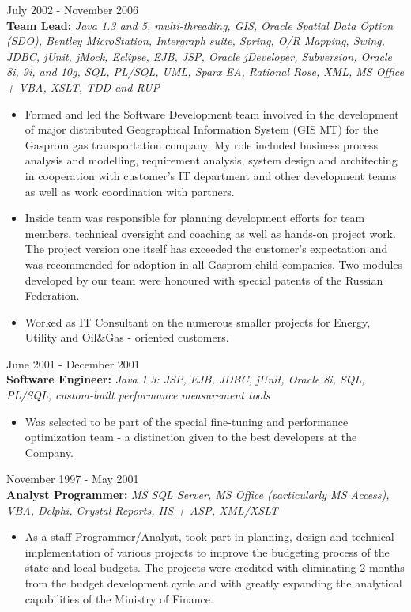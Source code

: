 \documentclass{res}
\begin{document}
\begin{resume}
 \hfill        July 2002 - November 2006\\
{\bf Team Lead:} {\em Java 1.3 and 5, multi-threading, GIS, Oracle Spatial Data Option (SDO), Bentley MicroStation, Intergraph suite, Spring, O/R Mapping, Swing, JDBC, jUnit, jMock, Eclipse, EJB, JSP, Oracle jDeveloper, Subversion, Oracle 8i, 9i, and 10g, SQL, PL/SQL, UML, Sparx EA, Rational Rose, XML, MS Office + VBA, XSLT, TDD and RUP}
\begin{itemize} \itemsep -2pt %
 \item Formed and led the Software Development team involved in the development of major distributed Geographical Information System (GIS MT) for the Gasprom gas transportation company. My role included business process analysis and modelling, requirement analysis, system design and architecting in cooperation with customer’s IT department and other development teams as well as work coordination with partners.
 \item Inside team was responsible for planning development efforts for team members, technical oversight and coaching as well as hands-on project work. The project version one itself has exceeded the customer’s expectation and was recommended for adoption in all Gasprom child companies. Two modules developed by our team were honoured with special patents of the Russian Federation.
 \item Worked as IT Consultant on the numerous smaller projects for Energy, Utility and Oil\&Gas - oriented customers.
\end{itemize}

 \hfill        June 2001 - December 2001\\
{\bf Software Engineer:} {\em Java 1.3: JSP, EJB, JDBC, jUnit, Oracle 8i, SQL, PL/SQL, custom-built performance measurement tools}
\begin{itemize} \itemsep -2pt %
 \item Was selected to be part of the special fine-tuning and performance optimization team - a distinction given to the best developers at the Company.
\end{itemize}

 \hfill        November 1997 - May 2001\\
{\bf Analyst Programmer:} {\em MS SQL Server, MS Office (particularly MS Access), VBA, Delphi, Crystal Reports, IIS + ASP, XML/XSLT}
\begin{itemize} \itemsep -2pt %
 \item As a staff Programmer/Analyst, took part in planning, design and technical implementation of various projects to improve the budgeting process of the state and local budgets.  The projects were credited with eliminating 2 months from the budget development cycle and with greatly expanding the analytical capabilities of the Ministry of Finance.
\end{itemize}


\end{resume}
\end{document}
